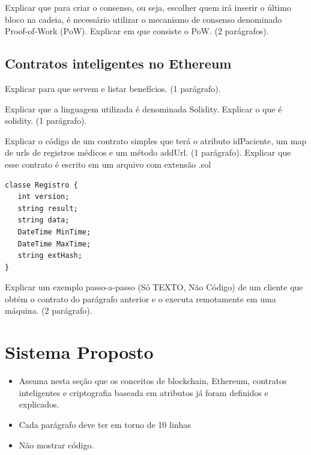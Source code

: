 \documentclass[a4paper,11pt]{article}
\begin{document}
{\color{ForestGreen}Explicar que para criar o consenso, ou seja, escolher quem irá inserir o último bloco na cadeia, é necessário utilizar o mecanismo de consenso denominado Proof-of-Work (PoW). Explicar em que consiste o PoW. (2 parágrafos).} 

\subsection{Contratos inteligentes no Ethereum}

{\color{ForestGreen}Explicar para que servem e listar benefícios. (1 parágrafo).} 

{\color{ForestGreen}Explicar que a linguagem utilizada é denominada Solidity. Explicar o que é solidity. (1 parágrafo).} 

{\color{ForestGreen}Explicar o código de um contrato simples que terá o atributo idPaciente, um map de urls de registros médicos e um método addUrl. (1 parágrafo). Explicar que esse contrato é escrito em um arquivo com extensão .sol} 

\begin{lstlisting}
classe Registro {
   int version;
   string result;
   string data;
   DateTime MinTime;
   DateTime MaxTime;
   string extHash;
}
\end{lstlisting}


{\color{ForestGreen}Explicar um exemplo passo-a-passo (Só TEXTO, Não Código) de um cliente que obtém o contrato do parágrafo anterior e o executa remotamente em uma máquina. (2 parágrafo).} 


\newpage
\section{Sistema Proposto}

\begin{itemize}
    \item {\color{red} Assuma nesta seção que os conceitos de blockchain, Ethereum, contratos inteligentes e criptografia baseada em atributos já foram definidos e explicados.}
    
    \item {\color{red}Cada parágrafo deve ter em torno de 10 linhas}
    
    \item {\color{red}Não mostrar código.}
    
\end{itemize}
\end{document}

